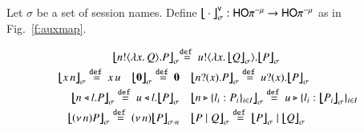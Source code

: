 \begin{definition}\label{d:trabs}\label{d:auxmap}
	Let $\sigma$ be a set of session names.
	Define $\big\lfloor\!\!\big\lfloor\cdot\big\rfloor\!\!\big\rfloor^\mathsf{v}_\sigma: \mathsf{HO}\pi^{-\mu} \to \mathsf{HO}\pi^{-\mu}$ as in Fig.~\ref{f:auxmap}.
%
\begin{figure}[t]
\[
\small
\begin{array}{rl}
	\auxmapp{\bout{n}{\abs{x}{Q}} P}{{}}{\sigma} &\!\!\!\!\!\!\defeq
		\bout{u}{\abs{x}{\auxmapp{Q}{{}}{\sigma}}} \auxmapp{P}{{}}{\sigma}
\\[1mm]
	\auxmapp{\appl{x}{n}}{{}}{\sigma}  \defeq
		\appl{x}{u} \quad 
	\auxmapp{\inact}{{}}{\sigma}  \defeq  \inact
 & 
			\auxmapp{\binp{n}{x} P}{{}}{\sigma}\defeq
		\binp{u}{x} \auxmapp{P}{{}}{\sigma} 
\\[1mm]
	\auxmapp{\bsel{n}{l} P}{{}}{\sigma} \defeq
		\bsel{u}{l} \auxmapp{P}{{}}{\sigma} 
 & 
	\auxmapp{\bbra{n}{l_i:P_i}_{i \in I}}{{}}{\sigma}  \defeq 
		\bbra{u}{l_i:\auxmapp{P_i}{{}}{\sigma}}_{i \in I}
	\vspace{1mm} \\
\auxmapp{\news{n} P}{{}}{\sigma}  \defeq  \news{n} \auxmapp{P}{{}}{{\sigma \cat n}}
 & 
	\auxmapp{P \Par Q}{{}}{\sigma}  \defeq  \auxmapp{P}{{}}{\sigma} \Par \auxmapp{Q}{{}}{\sigma} 
\end{array}
\]

\end{figure}
\end{definition}
